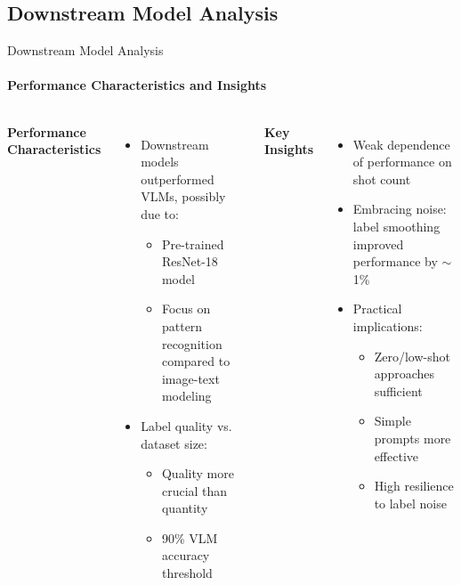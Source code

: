 \documentclass[aspectratio=169]{beamer}
\newcommand\customcolumnwidth{0.4625\textwidth}
\begin{document}
\subsection{Downstream Model Analysis}
\begin{frame}{Downstream Model Analysis}
\framesubtitle{Performance Characteristics and Insights}
  \vspace{-1em}
  \begin{columns}[T]
    \column{\customcolumnwidth}
      \textbf{Performance Characteristics}
      \begin{itemize}
        \item Downstream models outperformed VLMs, possibly due to:
        \begin{itemize}
          \item Pre-trained ResNet-18 model~
          \item Focus on pattern recognition compared to image-text modeling
        \end{itemize}
        \item Label quality vs. dataset size:
        \begin{itemize}
          \item Quality more crucial than quantity
          \item 90\% VLM accuracy threshold
        \end{itemize}
      \end{itemize}
    \column{\customcolumnwidth}
      \textbf{Key Insights}
      \begin{itemize}
        \item Weak dependence of performance on shot count
        \item Embracing noise: label smoothing improved performance by \(\sim\)1\%
        \item Practical implications:
        \begin{itemize}
          \item Zero/low-shot approaches sufficient
          \item Simple prompts more effective
          \item High resilience to label noise
        \end{itemize}
      \end{itemize}
  \end{columns}
\end{frame}
\end{document}
